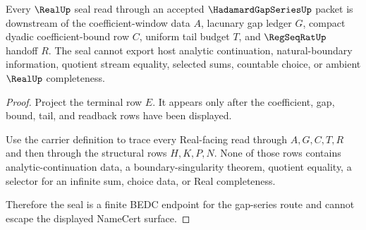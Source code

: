 \begin{theorem}
\label{thm:hadamard-gap-series-real-seal-nonescape}
Every $\RealUp$ seal read through an accepted $\HadamardGapSeriesUp$ packet is downstream of the coefficient-window data $A$, lacunary gap ledger $G$, compact dyadic coefficient-bound row $C$, uniform tail budget $T$, and $\RegSeqRatUp$ handoff $R$. The seal cannot export host analytic continuation, natural-boundary information, quotient stream equality, selected sums, countable choice, or ambient $\RealUp$ completeness.
\end{theorem}
\begin{proof}
Project the terminal row $E$. It appears only after the coefficient, gap, bound, tail, and readback rows have been displayed.

Use the carrier definition to trace every Real-facing read through $A,G,C,T,R$ and then through the structural rows $H,K,P,N$. None of those rows contains analytic-continuation data, a boundary-singularity theorem, quotient equality, a selector for an infinite sum, choice data, or Real completeness.

Therefore the seal is a finite BEDC endpoint for the gap-series route and cannot escape the displayed NameCert surface.
\end{proof}




